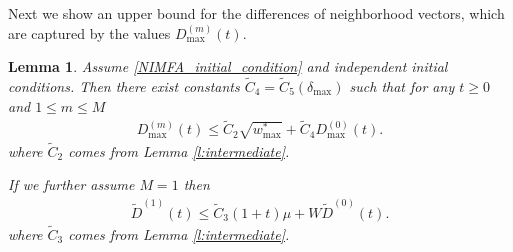 \documentclass{article}
\newcommand{\1}[1]{{\mathds{1}}_{\left\{#1\right\}}}
\newtheorem{lemma}{Lemma}
\newcommand{\remm}[1]{{#1}}
\begin{document}
	Next we show an upper bound for the differences of neighborhood vectors, which are captured by the values $D^{(m)}_{\max}(t)$.
	\begin{lemma}
		\label{l:environment}
		Assume \eqref{NIMFA_initial_condition} and independent initial conditions. Then there exist constants $ \tilde{C}_{4}=\tilde{C}_{5}\left(\delta_{\max} \right)$ such that for any $t \geq 0$ and $1 \leq m \leq M$
		\begin{align*}
			D^{(m)}_{\max}(t) \leq \tilde{C}_{2}\sqrt{\remm{w_{\max}^{*}}}+\tilde{C}_4 D_{\max}^{(0)}(t).
		\end{align*}
		where $\tilde{C}_2$ comes from Lemma \ref{l:intermediate}.
		
		If we further assume $M=1$ then
		\begin{align*}
			\tilde{D}^{(1)}(t) \leq \tilde{C}_3\remm{(1+t)} \mu+W \tilde{D}^{(0)}(t).
		\end{align*}
		where $\tilde{C}_3$ comes from Lemma \ref{l:intermediate}.
	\end{lemma}
	
\end{document}

